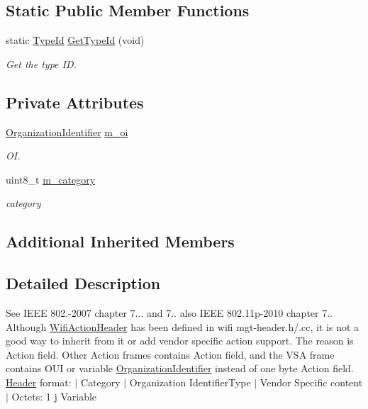 \subsection*{Static Public Member Functions}
\begin{DoxyCompactItemize}
\item 
static \hyperlink{classns3_1_1TypeId}{Type\+Id} \hyperlink{classns3_1_1VendorSpecificActionHeader_a1f1df82fc06cbcaa618841bbd075d32d}{Get\+Type\+Id} (void)
\begin{DoxyCompactList}\small\item\em Get the type ID. \end{DoxyCompactList}\end{DoxyCompactItemize}
\subsection*{Private Attributes}
\begin{DoxyCompactItemize}
\item 
\hyperlink{classns3_1_1OrganizationIdentifier}{Organization\+Identifier} \hyperlink{classns3_1_1VendorSpecificActionHeader_a026ab2e6e0cd5fdc3270f8fcefc95db4}{m\+\_\+oi}
\begin{DoxyCompactList}\small\item\em OI. \end{DoxyCompactList}\item 
uint8\+\_\+t \hyperlink{classns3_1_1VendorSpecificActionHeader_a2fc4b586a5cbba95b3a7e64b50f5d719}{m\+\_\+category}
\begin{DoxyCompactList}\small\item\em category \end{DoxyCompactList}\end{DoxyCompactItemize}
\subsection*{Additional Inherited Members}


\subsection{Detailed Description}
See I\+E\+EE 802.-\/2007 chapter 7... and 7.. also I\+E\+EE 802.\+11p-\/2010 chapter 7.. Although \hyperlink{classns3_1_1WifiActionHeader}{Wifi\+Action\+Header} has been defined in wifi mgt-\/header.\+h/.cc, it is not a good way to inherit from it or add vendor specific action support. The reason is Action field. Other Action frames contains Action field, and the V\+SA frame contains O\+UI or variable \hyperlink{classns3_1_1OrganizationIdentifier}{Organization\+Identifier} instead of one byte Action field. \hyperlink{classns3_1_1Header}{Header} format\+: $\vert$ Category $\vert$ Organization Identifier\+Type $\vert$ Vendor Specific content $\vert$ Octets\+: 1 j Variable

